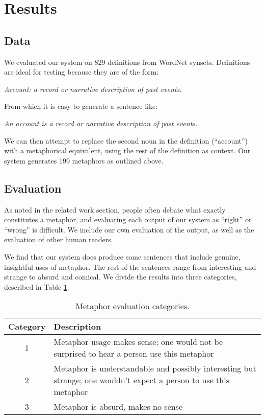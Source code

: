 \documentclass[12pt]{article}
\begin{document}
\section{Results}

\subsection{Data}
We evaluated our system on 829 definitions from WordNet synsets. Definitions are ideal for testing because they are of the form:

\begin{center}
    \emph{Account: a record or narrative description of past events.}
\end{center}

From which it is easy to generate a sentence like:

\begin{center}
    \emph{An account is a record or narrative description of past events.}
\end{center}

We can then attempt to replace the second noun in the definition (``account'') with a metaphorical equivalent, using the rest of the definition as context. Our system generates 199 metaphors as outlined above.

\subsection{Evaluation}

As noted in the related work section, people often debate what exactly constitutes a metaphor, and evaluating each output of our system as ``right'' or ``wrong'' is difficult. We include our own evaluation of the output, as well as the evaluation of other human readers.

We find that our system does produce some sentences that include genuine, insightful uses of metaphor. The rest of the sentences range from interesting and strange to absurd and comical. We divide the results into three categories, described in Table \ref{tab:evalcats}.

\begin{table}[h]
	\centering
	\small
	\begin{tabular}{|c|p{12cm}|} \hline
		\textbf{Category} & \textbf{Description}\\ \hline
		1 & Metaphor usage makes sense; one would not be surprised to hear a person use this metaphor\\ \hline
        2 & Metaphor is understandable and possibly interesting but strange; one wouldn’t expect a person to use this metaphor\\ \hline
		3 & Metaphor is absurd, makes no sense\\ \hline
	\end{tabular}
	\caption{Metaphor evaluation categories.}
	\label{tab:evalcats}
\end{table}
\end{document}
